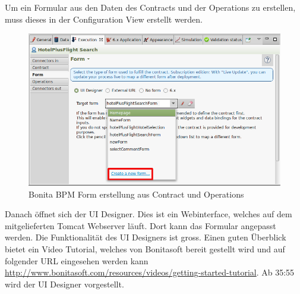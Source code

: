 Um ein Formular aus den Daten des Contracts und der Operations zu erstellen, muss dieses in der Configuration View erstellt werden.
\begin{figure}[H]
	\centering
	\includegraphics[width=1\textwidth]{images/bonita-forms-create.png}
	\caption{Bonita BPM Form erstellung aus Contract und Operations}
	\label{fig:analyse:bonita:forms:forms:creation}
\end{figure}

Danach öffnet sich der UI Designer. Dies ist ein Webinterface, welches auf dem mitgelieferten Tomcat Webserver läuft. Dort kann das Formular angepasst werden.
Die Funktionalität des UI Designers ist gross. Einen guten Überblick bietet ein Video Tutorial, welches von Bonitasoft bereit gestellt wird und auf folgender URL eingesehen werden kann \url{http://www.bonitasoft.com/resources/videos/getting-started-tutorial}. Ab 35:55 wird der UI Designer vorgestellt.
